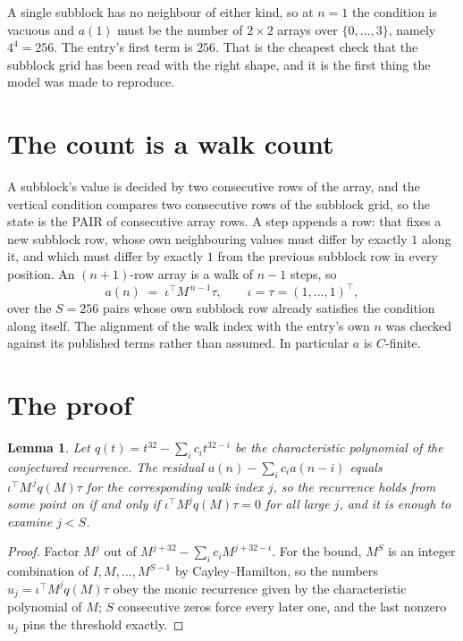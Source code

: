 \documentclass[11pt,a4paper]{article}
\theoremstyle{plain}
\newtheorem{lemma}[theorem]{Lemma}
\theoremstyle{definition}
\begin{document}
A single subblock has no neighbour of either kind, so at $n=1$ the condition is vacuous and
$a(1)$ must be the number of $2\times2$ arrays over $\{0,\dots,3\}$, namely
$4^{4}=256$. The entry's first term is $256$.
That is the cheapest check that the subblock grid has been read with the right shape, and it
is the first thing the model was made to reproduce.

\section{The count is a walk count}

A subblock's value is decided by two consecutive rows of the array, and the
vertical condition compares two consecutive rows of the subblock grid, so the state is the
PAIR of consecutive array rows. A step appends a row: that fixes a new subblock row, whose own
neighbouring values must differ by exactly $1$ along it, and which must differ by exactly
$1$ from the previous subblock row in every position. An $(n+1)$-row array is a walk of
$n-1$ steps, so
\[
a(n)\;=\;\iota^{\!\top}M^{\,n-1}\tau,\qquad\iota=\tau=(1,\dots,1)^{\!\top},
\]
over the $S=256$ pairs whose own subblock row already satisfies the condition along itself.
The alignment of the walk index with the entry's own $n$ was checked against its published
terms rather than assumed. In particular $a$ is $C$-finite.

\section{The proof}

\begin{lemma}\label{lem:crit}
Let $q(t)=t^{32}-\sum_i c_it^{32-i}$ be the characteristic polynomial of the
conjectured recurrence. The residual $a(n)-\sum_ic_ia(n-i)$ equals
$\iota^{\!\top}M^{\,j}q(M)\tau$ for the corresponding walk index $j$, so the recurrence
holds from some point on if and only if $\iota^{\!\top}M^{j}q(M)\tau=0$ for all large $j$,
and it is enough to examine $j<S$.
\end{lemma}

\begin{proof}
Factor $M^{j}$ out of $M^{j+32}-\sum_ic_iM^{j+32-i}$. For the bound, $M^{S}$
is an integer combination of $I,M,\dots,M^{S-1}$ by Cayley--Hamilton, so the numbers
$u_j=\iota^{\!\top}M^{j}q(M)\tau$ obey the monic recurrence given by the characteristic
polynomial of $M$; $S$ consecutive zeros force every later one, and the last nonzero $u_j$
pins the threshold exactly.
\end{proof}
\end{document}
